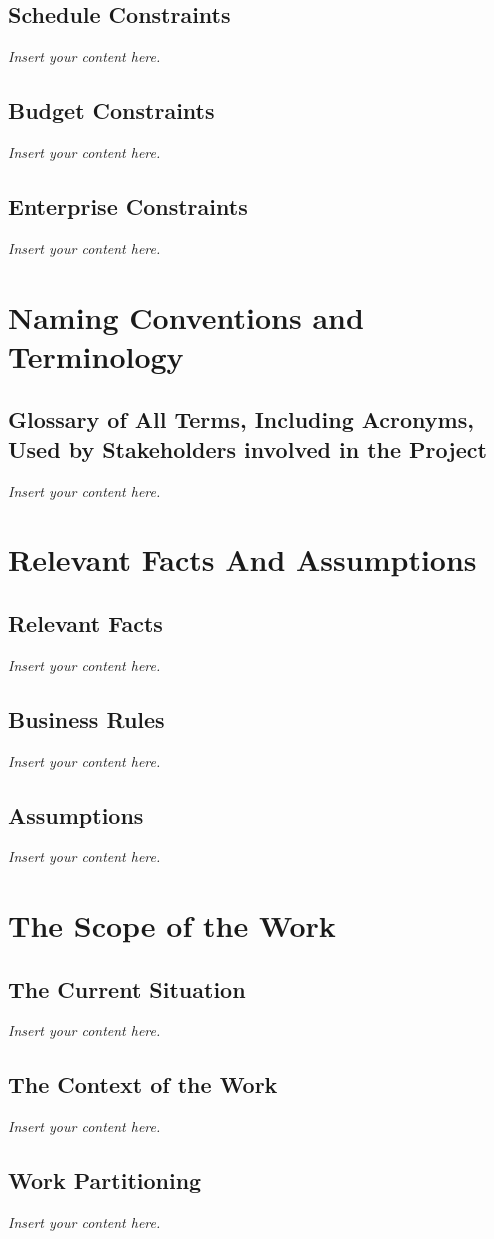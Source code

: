 \documentclass[12pt]{article}
\newcommand{\lips}{\textit{Insert your content here.}}
\begin{document}
\subsection{Schedule Constraints}
\lips
\subsection{Budget Constraints}
\lips
\subsection{Enterprise Constraints}
\lips

\section{Naming Conventions and Terminology}
\subsection{Glossary of All Terms, Including Acronyms, Used by Stakeholders
involved in the Project}
\lips

\section{Relevant Facts And Assumptions}
\subsection{Relevant Facts}
\lips
\subsection{Business Rules}
\lips
\subsection{Assumptions}
\lips

\section{The Scope of the Work}
\subsection{The Current Situation}
\lips
\subsection{The Context of the Work}
\lips
\subsection{Work Partitioning}
\lips
\end{document}
